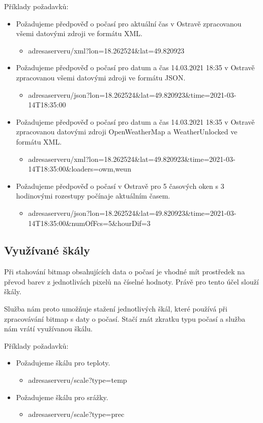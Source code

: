 \documentclass[czech,bachelor,dept460,male,csharp,cpdeclaration]{diploma}
\begin{document}
	Příklady požadavků:
	\begin{itemize}
		\item Požadujeme předpověď o počasí pro aktuální čas v Ostravě zpracovanou všemi datovými zdroji ve formátu XML.
		\begin{itemize}
			\item adresaserveru/xml?lon=18.262524\&lat=49.820923
	   \end{itemize}	
		\item Požadujeme předpověď o počasí pro datum a čas 14.03.2021 18:35 v Ostravě zpracovanou všemi datovými zdroji ve formátu JSON.
		\begin{itemize}
			\item adresaserveru/json?lon=18.262524\&lat=49.820923\&time=2021-03-14T18:35:00
		\end{itemize}
		\item Požadujeme předpověď o počasí pro datum a čas 14.03.2021 18:35 v Ostravě zpracovanou datovými zdroji OpenWeatherMap a WeatherUnlocked ve formátu XML.
		\begin{itemize}
			\item adresaserveru/xml?lon=18.262524\&lat=49.820923\&time=2021-03-14T18:35:00\&loaders=owm,weun
		\end{itemize}
		\item Požadujeme předpověď o počasí v Ostravě pro 5 časových oken s 3 hodinovými rozestupy počínaje aktuálním časem.
		\begin{itemize}
			\item adresaserveru/json?lon=18.262524\&lat=49.820923\&time=2021-03-14T18:35:00\&numOfFcs=5\&hourDif=3
		\end{itemize}
	\end{itemize}
	
	\subsection{Využívané škály}
	
	Při stahování bitmap obsahujících data o počasí je vhodné mít prostředek na převod barev z jednotlivách pixelů na číselné hodnoty. Právě pro tento účel slouží škály.
	
	Služba nám proto umožňuje stažení jednotlivých škál, které používá při zpracovávání bitmap s daty o počasí. Stačí znát zkratku typu počasí a služba nám vrátí využívanou škálu.
	
	Příklady požadavků:
	\begin{itemize}
		\item Požadujeme škálu pro teploty.
		\begin{itemize}
			\item adresaserveru/scale?type=temp
		\end{itemize}
		\item Požadujeme škálu pro srážky.
		\begin{itemize}
			\item adresaserveru/scale?type=prec
		\end{itemize}
	\end{itemize}
	
\end{document}
